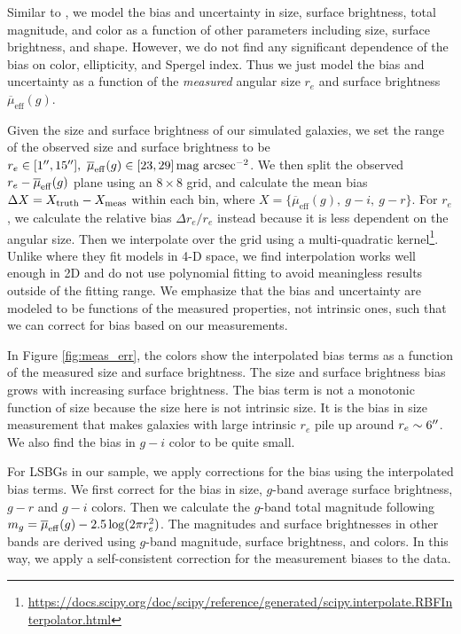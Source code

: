 \documentclass[twocolumn,astrosymb,twocolappendix]{aastex631}
\newcommand{\sbunit}{\mathrm{mag\ arcsec}^{-2}}
\newcommand{\sbeff}{\overline{\mu}_{\mathrm{eff}}(g)}
\begin{document}
\begin{CJK*}{UTF8}{gbsn}
Similar to \citet{Zaritsky2021}, we model the bias and uncertainty in size, surface brightness, total magnitude, and color as a function of other parameters including size, surface brightness, and shape. However, we do not find any significant dependence of the bias on color, ellipticity, and Spergel index. Thus we just model the bias and uncertainty as a function of the \textit{measured} angular size $r_e$ and surface brightness $\sbeff$.

Given the size and surface brightness of our simulated galaxies, we set the range of the observed size and surface brightness to be $r_e\in[1\arcsec, 15\arcsec],\ \sbeff\in[23, 29]\,\sbunit$. We then split the observed $r_e-\overline{\mu}_{\rm eff}(g)$ plane using an $8\times 8$ grid, and calculate the mean bias $\Delta X = X_{\rm truth} - X_{\rm meas}$ within each bin, where $X=\{\sbeff,\ g-i,\ g-r\}$. For $r_e$, we calculate the relative bias $\Delta r_e / r_e$ instead because it is less dependent on the angular size. Then we interpolate over the grid using a multi-quadratic kernel\footnote{\url{https://docs.scipy.org/doc/scipy/reference/generated/scipy.interpolate.RBFInterpolator.html}}. Unlike \citet{Zaritsky2021} where they fit models in 4-D space, we find interpolation works well enough in 2D and do not use polynomial fitting to avoid meaningless results outside of the fitting range. We emphasize that the bias and uncertainty are modeled to be functions of the measured properties, not intrinsic ones, such that we can correct for bias based on our measurements. 

In Figure \ref{fig:meas_err}, the colors show the interpolated bias terms as a function of the measured size and surface brightness. The size and surface brightness bias grows with increasing surface brightness. The bias term is not a monotonic function of size because the size here is not intrinsic size. It is the bias in size measurement that makes galaxies with large intrinsic $r_e$ pile up around $r_e\sim 6\mbox{$^{\prime\prime}$}$. We also find the bias in $g-i$ color to be quite small. 

For LSBGs in our sample, we apply corrections for the bias using the interpolated bias terms. We first correct for the bias in size, $g$-band average surface brightness, $g-r$ and $g-i$ colors. Then we calculate the $g$-band total magnitude following $m_g = \overline{\mu}_{\rm eff}(g) - 2.5\log(2\pi r_e^2)$. The magnitudes and surface brightnesses in other bands are derived using $g$-band magnitude, surface brightness, and colors. In this way, we apply a self-consistent correction for the measurement biases to the data. 


\end{CJK*}
\end{document}
